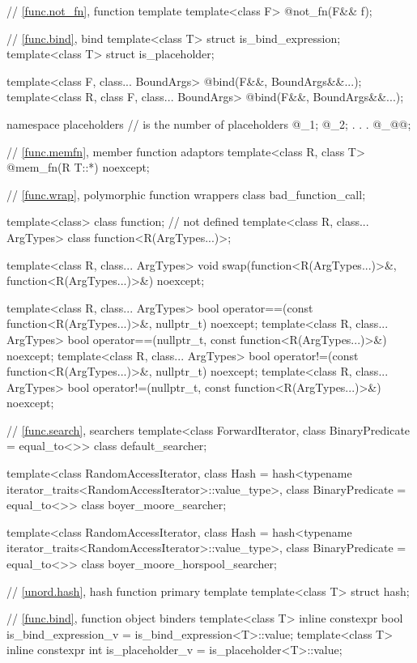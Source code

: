 \begin{codeblock}
{  // \ref{func.not_fn}, function template 
  template<class F> @\unspec@ not_fn(F&& f);

  // \ref{func.bind}, bind
  template<class T> struct is_bind_expression;
  template<class T> struct is_placeholder;

  template<class F, class... BoundArgs>
    @\unspec@ bind(F&&, BoundArgs&&...);
  template<class R, class F, class... BoundArgs>
    @\unspec@ bind(F&&, BoundArgs&&...);

  namespace placeholders {
    //  is the  number of placeholders
    @\seebelownc@ _1;
    @\seebelownc@ _2;
               .
               .
               .
    @\seebelownc@ _@@;
  }

  // \ref{func.memfn}, member function adaptors
  template<class R, class T>
    @\unspec@ mem_fn(R T::*) noexcept;

  // \ref{func.wrap}, polymorphic function wrappers
  class bad_function_call;

  template<class> class function; // not defined
  template<class R, class... ArgTypes> class function<R(ArgTypes...)>;

  template<class R, class... ArgTypes>
    void swap(function<R(ArgTypes...)>&, function<R(ArgTypes...)>&) noexcept;

  template<class R, class... ArgTypes>
    bool operator==(const function<R(ArgTypes...)>&, nullptr_t) noexcept;
  template<class R, class... ArgTypes>
    bool operator==(nullptr_t, const function<R(ArgTypes...)>&) noexcept;
  template<class R, class... ArgTypes>
    bool operator!=(const function<R(ArgTypes...)>&, nullptr_t) noexcept;
  template<class R, class... ArgTypes>
    bool operator!=(nullptr_t, const function<R(ArgTypes...)>&) noexcept;

  // \ref{func.search}, searchers
  template<class ForwardIterator, class BinaryPredicate = equal_to<>>
    class default_searcher;

  template<class RandomAccessIterator,
           class Hash = hash<typename iterator_traits<RandomAccessIterator>::value_type>,
           class BinaryPredicate = equal_to<>>
    class boyer_moore_searcher;

  template<class RandomAccessIterator,
           class Hash = hash<typename iterator_traits<RandomAccessIterator>::value_type>,
           class BinaryPredicate = equal_to<>>
    class boyer_moore_horspool_searcher;

  // \ref{unord.hash}, hash function primary template
  template<class T>
    struct hash;

  // \ref{func.bind}, function object binders
  template<class T>
    inline constexpr bool is_bind_expression_v = is_bind_expression<T>::value;
  template<class T>
    inline constexpr int is_placeholder_v = is_placeholder<T>::value;
}
\end{codeblock}

